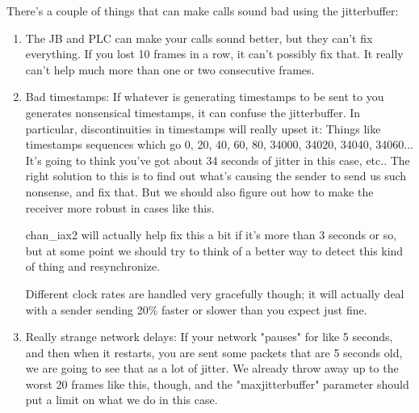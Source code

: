 There's a couple of things that can make calls sound bad using the jitterbuffer:

\begin{enumerate}
\item The JB and PLC can make your calls sound better, but they can't fix everything.
If you lost 10 frames in a row, it can't possibly fix that.  It really can't help much
more than one or two consecutive frames.

\item Bad timestamps:  If whatever is generating timestamps to be sent to you generates
nonsensical timestamps, it can confuse the jitterbuffer.  In particular, discontinuities
in timestamps will really upset it:  Things like timestamps sequences which go 0, 20, 40,
60, 80,  34000, 34020, 34040, 34060...   It's going to think you've got about 34 seconds
of jitter in this case, etc..
The right solution to this is to find out what's causing the sender to send us such nonsense,
and fix that.  But we should also figure out how to make the receiver more robust in
cases like this.

chan\_iax2 will actually help fix this a bit if it's more than 3 seconds or so, but at
some point we should try to think of a better way to detect this kind of thing and
resynchronize.

Different clock rates are handled very gracefully though; it will actually deal with a
sender sending 20\% faster or slower than you expect just fine.

\item Really strange network delays:  If your network "pauses" for like 5 seconds, and then
when it restarts, you are sent some packets that are 5 seconds old, we are going to see
that as a lot of jitter.   We already throw away up to the worst 20 frames like this,
though, and the "maxjitterbuffer" parameter should put a limit on what we do in this case.

\end{enumerate}
